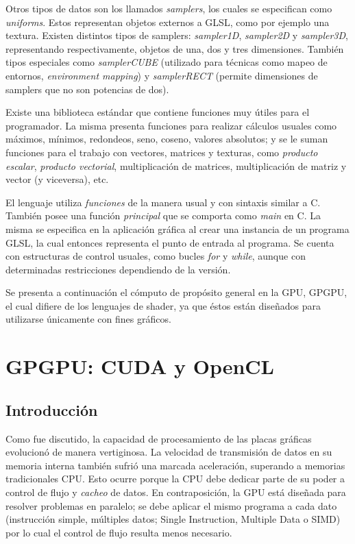 Otros tipos de datos son los llamados {\em samplers}, los cuales se especifican como {\em uniforms}. Estos representan objetos externos a GLSL, como por ejemplo una textura.
Existen distintos tipos de samplers: {\em sampler1D}, {\em sampler2D} y {\em sampler3D}, representando respectivamente, objetos de una, dos y tres dimensiones. Tambi\'en tipos especiales como {\em samplerCUBE} (utilizado para t\'ecnicas como mapeo de entornos, {\em environment mapping}) y {\em samplerRECT} (permite dimensiones de samplers que no son potencias de dos).

Existe una biblioteca est\'andar que contiene funciones muy \'utiles para el programador. La misma presenta funciones para realizar c\'alculos usuales como m\'aximos, m\'inimos, redondeos, seno, coseno, valores absolutos; y se le suman funciones para el trabajo con vectores, matrices y texturas, como {\em producto escalar}, {\em producto vectorial}, multiplicaci\'on de matrices, multiplicaci\'on de matriz y vector (y viceversa), etc.

El lenguaje utiliza {\em funciones} de la manera usual y con sintaxis similar a C.
Tambi\'en posee una funci\'on {\em principal} que se comporta como {\em main} en C.
La misma se especifica en la aplicaci\'on gr\'afica al crear una instancia de un programa GLSL, la cual entonces representa el punto de entrada al programa.
Se cuenta con estructuras de control usuales, como bucles {\em for} y {\em while}, aunque con determinadas restricciones dependiendo de la versión.

Se presenta a continuaci\'on el cómputo de prop\'osito general en la GPU, GPGPU, el cual difiere de los lenguajes de shader, ya que éstos est\'an dise\~nados para utilizarse \'unicamente con fines gr\'aficos.

\section{GPGPU: CUDA y OpenCL}

\subsection{Introducción}
Como fue discutido, la capacidad de procesamiento de las placas gr\'aficas evolucionó de manera vertiginosa.
La velocidad de transmisi\'on de datos en su memoria interna tambi\'en sufrió una marcada aceleración, superando a memorias tradicionales CPU.
Esto ocurre porque la CPU debe dedicar parte de su poder a control de flujo y {\em cacheo} de datos.
En contraposici\'on, la GPU est\'a dise\~nada para resolver problemas en paralelo; se debe aplicar el mismo programa a cada dato (instrucción simple, múltiples datos; Single Instruction, Multiple Data o \acrshort{SIMD}) por lo cual el control de flujo resulta menos necesario.

